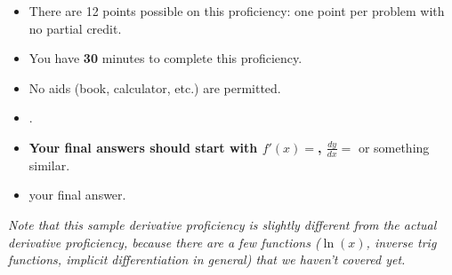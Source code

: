 \documentclass[12pt]{article}
\begin{document}
\begin{itemize}
\item 
There are 12 points possible on this proficiency: one point per problem with
no partial credit. 

\item You have \textbf{30} minutes to complete this proficiency.

\item No aids (book, calculator, etc.) are permitted.  

\item {}.

\item {\bf Your final answers should start with $f'(x)=$, $\frac{dy}{dx}=$} or
something similar.

\item { your final answer. }
\end{itemize}

{\it Note that this sample derivative proficiency is slightly different from the actual derivative proficiency, because there are a few functions ($\ln(x)$, inverse trig functions, implicit differentiation in general) that we haven't covered yet.} 
\end{document}
